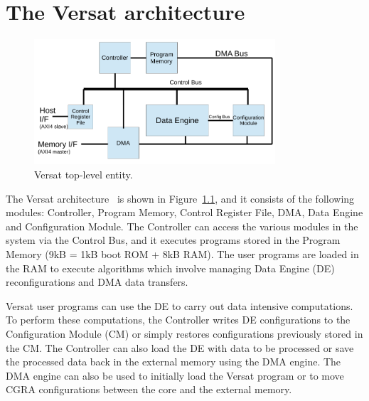 
\chapter{The Versat architecture}
\label{chapter:versat}

\begin{figure}[!htb]
	\centering
	\includegraphics[width=0.8\textwidth]{Figures/top.png}
	\caption{Versat top-level entity.}
	\label{fig:top}
\end{figure}

The Versat architecture~\cite{sousa:versat, sousa:versat2016, sousa:controller,
  sousa:compiler} is shown in Figure~\ref{fig:top}, and it consists of the
following modules: Controller, Program Memory, Control Register File, DMA, Data
Engine and Configuration Module. The Controller can access the various modules
in the system via the Control Bus, and it executes programs stored in the
Program Memory (9kB = 1kB boot ROM + 8kB RAM). The user programs are loaded in
the RAM to execute algorithms which involve managing Data Engine (DE)
reconfigurations and DMA data transfers.

Versat user programs can use the DE to carry out data intensive computations. To
perform these computations, the Controller writes DE configurations to the
Configuration Module (CM) or simply restores configurations previously stored in
the CM. The Controller can also load the DE with data to be processed or save
the processed data back in the external memory using the DMA engine. The DMA
engine can also be used to initially load the Versat program or to move CGRA
configurations between the core and the external memory.

